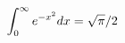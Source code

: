 \documentclass[preview]{standalone}
\begin{document}
\begin{align*}
\special{dvisvgm:raw <g id='unique000'>}\int_0^\infty e^{-x^2}dx=\sqrt\pi/2\special{dvisvgm:raw </g>}
\end{align*}
\end{document}

